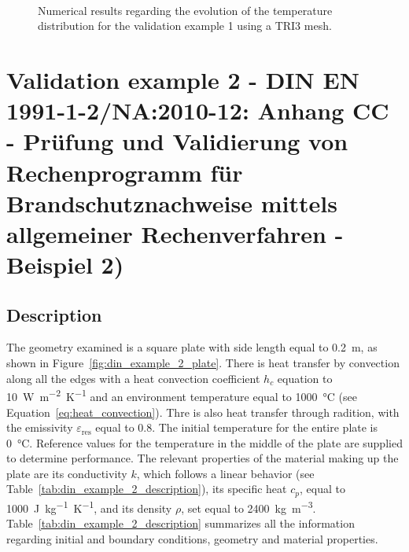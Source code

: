 \begin{figure}
   \centering
     \\
    \caption{Numerical results regarding the evolution of the temperature distribution for the validation example 1 using a TRI3 mesh.}
    \label{fig:DIN_example_1_TRI3}
\end{figure}

\section{Validation example 2 - DIN EN 1991-1-2/NA:2010-12: Anhang CC - Prüfung und Validierung von Rechenprogramm für Brandschutznachweise mittels allgemeiner Rechenverfahren - Beispiel 2)}

\subsection{Description}

The geometry examined is a square plate with side length equal to \SI{0.2}{\meter}, as shown in Figure~\ref{fig:din_example_2_plate}.
There is heat transfer by convection along all the edges with a heat convection coefficient \(h_c\) equation to \SI{10}{\watt\meter^{-2}\kelvin^{-1}} and an environment temperature equal to \SI{1000}{\celsius} (see Equation~\ref{eq:heat_convection}).
Thre is also heat transfer through radition, with the emissivity \(\varepsilon_\text{res}\) equal to 0.8.
The initial temperature for the entire plate is \SI{0}{\celsius}.
Reference values for the temperature in the middle of the plate are supplied to determine performance.
The relevant properties of the material making up the plate are its conductivity \(k\), which follows a linear behavior (see Table~\ref{tab:din_example_2_description}), its specific heat \(c_p\), equal to \SI{1000}{\joule\kilo\gram^{-1}\kelvin^{-1}}, and its density \(\rho\), set equal to \SI{2400}{\kilo\gram\meter^{-3}}.
Table~\ref{tab:din_example_2_description} summarizes all the information regarding initial and boundary conditions, geometry and material properties.

